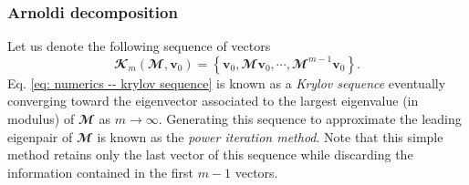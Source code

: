     \subsubsection{Arnoldi decomposition}
    \label{subsubsec: numerics -- arnoldi}

    Let us denote the following sequence of vectors
    \begin{equation}
      \mathbfcal{K}_m\left( \mathbfcal{M}, \mathbf{v}_0 \right) = \left\{ \mathbf{v}_0, \mathbfcal{M}\mathbf{v}_0, \cdots, \mathbfcal{M}^{m-1} \mathbf{v}_0 \right\}.
      \label{eq: numerics -- krylov sequence}
    \end{equation}
    Eq. \eqref{eq: numerics -- krylov sequence} is known as a \emph{Krylov sequence} eventually converging toward the eigenvector associated to the largest eigenvalue (in modulus) of $\mathbfcal{M}$ as $m \to \infty$. Generating this sequence to approximate the leading eigenpair of $\mathbfcal{M}$ is known as the \emph{power iteration method}. Note that this simple method retains only the last vector of this sequence while discarding the information contained in the first $m-1$ vectors.

